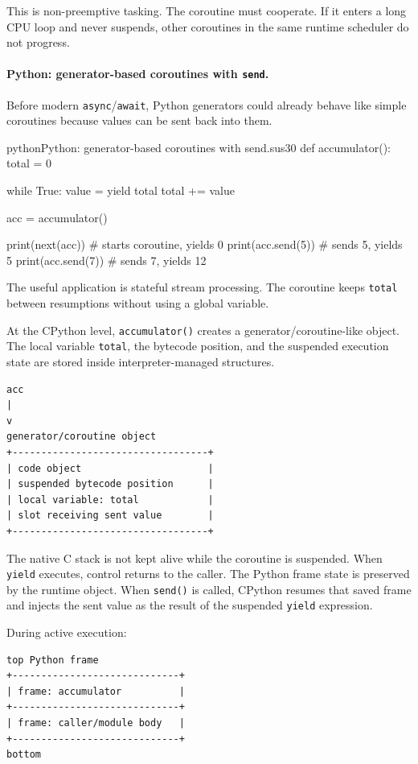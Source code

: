This is non-preemptive tasking. The coroutine must cooperate. If it enters a long CPU loop and never suspends, other coroutines in the same runtime scheduler do not progress.

\paragraph{Python: generator-based coroutines with \texttt{send}.}

Before modern \texttt{async}/\texttt{await}, Python generators could already behave like simple coroutines because values can be sent back into them.

\begin{codebox}[]{python}{Python: generator-based coroutines with send.}{sus30}
def accumulator():
    total = 0

    while True:
        value = yield total
        total += value


acc = accumulator()

print(next(acc))      # starts coroutine, yields 0
print(acc.send(5))    # sends 5, yields 5
print(acc.send(7))    # sends 7, yields 12
\end{codebox}


The useful application is stateful stream processing. The coroutine keeps \texttt{total} between resumptions without using a global variable.

At the CPython level, \texttt{accumulator()} creates a generator/coroutine-like object. The local variable \texttt{total}, the bytecode position, and the suspended execution state are stored inside interpreter-managed structures.

\begin{verbatim}
acc
|
v
generator/coroutine object
+----------------------------------+
| code object                      |
| suspended bytecode position      |
| local variable: total            |
| slot receiving sent value        |
+----------------------------------+
\end{verbatim}

The native C stack is not kept alive while the coroutine is suspended. When \texttt{yield} executes, control returns to the caller. The Python frame state is preserved by the runtime object. When \texttt{send()} is called, CPython resumes that saved frame and injects the sent value as the result of the suspended \texttt{yield} expression.

During active execution:

\begin{verbatim}
top Python frame
+-----------------------------+
| frame: accumulator          |
+-----------------------------+
| frame: caller/module body   |
+-----------------------------+
bottom
\end{verbatim}

